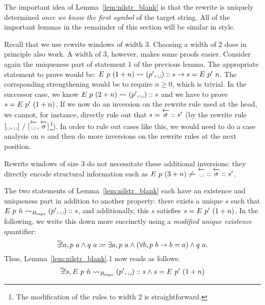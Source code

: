 The important idea of Lemma~\ref{lem:nilstr_blank} is that the rewrite is uniquely determined \emph{once we know the first symbol} of the target string. All of the important lemmas in the remainder of this section will be similar in style.

\begin{remark}
  Recall that we use rewrite windows of width 3. Choosing a width of 2 does in principle also work. 
  A width of 3, however, makes some proofs easier. Consider again the uniqueness part of statement 1 of the previous lemma. 
  The appropriate statement to prove would be: $\nilstr{p}{(\natS{n})} \strent{} (p', \blank) :: s \rightarrow s = \nilstr{p'}{n}$. The corrsponding strengthening would be to require $n \ge 0$, which is trivial. 
  In the successor case, we know $\nilstr{p}{(2 + n)} \strent{} (p', \blank) :: s$ and we have to prove $s = E~p'~(1 + n)$. If we now do an inversion on the rewrite rule used at the head, we cannot, for instance, directly rule out that $s = \polneg{\sigma} :: s'$ (by the rewrite rule $[\blank, \blank]~/~[\polneg{\blank}, \polneg{\sigma}]$\footnote{The modification of the rules to width 2 is straightforward.}). In order to rule out cases like this, we would need to do a case analysis on $n$ and then do more inversions on the rewrite rules at the next position. 

  Rewrite windows of size 3 do not necessitate these additional inversions: they directly encode structural information such as $\nilstr{p}{(3+n)} \not\strent{} \polneg{\blank} :: \polneg{\sigma} :: s'$. 
\end{remark}

\newcommand{\mexists}{\overline{\exists}!}
The two statements of Lemma~\ref{lem:nilstr_blank} each have an existence and uniqueness part in addition to another property: there exists a unique $s$ such that $\nilstr{p}{\hat{n}} \strent{\Rtape} (p', \blank) :: s$, and additionally, this $s$ satisfies $s = E~p'~(1 +{n})$. In the following, we write this down more succinctly using a \emph{modified unique existence} quantifier:
\[\mexists a, p~a \land q~a \defeq \exists a, p~a \land (\forall b, p~b \rightarrow b = a) \land q~a. \]
Thus, Lemma~\ref{lem:nilstr_blank}.1 now reads as follows: 
\[\mexists s, \nilstr{p}{\hat{n}} \strent{\Rtape} (p', \blank) :: s \land s = \nilstr{p'}{(\natS{n})}\]

